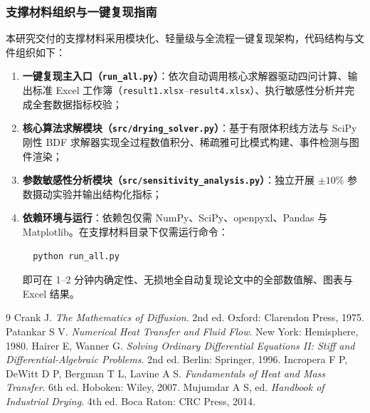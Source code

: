 \documentclass[12pt,a4paper]{ctexart}
\begin{document}
\subsubsection{支撑材料组织与一键复现指南}
本研究交付的支撑材料采用模块化、轻量级与全流程一键复现架构，代码结构与文件组织如下：
\begin{enumerate}[label=(\arabic*)]
  \item \textbf{一键复现主入口（\texttt{run\_all.py}）}：依次自动调用核心求解器驱动四问计算、输出标准 Excel 工作簿（\texttt{result1.xlsx}--\texttt{result4.xlsx}）、执行敏感性分析并完成全套数据指标校验；
  \item \textbf{核心算法求解模块（\texttt{src/drying\_solver.py}）}：基于有限体积线方法与 SciPy 刚性 BDF 求解器实现全过程数值积分、稀疏雅可比模式构建、事件检测与图件渲染；
  \item \textbf{参数敏感性分析模块（\texttt{src/sensitivity\_analysis.py}）}：独立开展 $\pm 10\%$ 参数摄动实验并输出结构化指标；
  \item \textbf{依赖环境与运行}：依赖包仅需 NumPy、SciPy、openpyxl、Pandas 与 Matplotlib。在支撑材料目录下仅需运行命令：
  \begin{verbatim}
  python run_all.py
  \end{verbatim}
  即可在 1--2 分钟内确定性、无损地全自动复现论文中的全部数值解、图表与 Excel 结果。
\end{enumerate}

\begin{thebibliography}{9}
 Crank J. \textit{The Mathematics of Diffusion}. 2nd ed. Oxford: Clarendon Press, 1975.
 Patankar S V. \textit{Numerical Heat Transfer and Fluid Flow}. New York: Hemisphere, 1980.
 Hairer E, Wanner G. \textit{Solving Ordinary Differential Equations II: Stiff and Differential-Algebraic Problems}. 2nd ed. Berlin: Springer, 1996.
 Incropera F P, DeWitt D P, Bergman T L, Lavine A S. \textit{Fundamentals of Heat and Mass Transfer}. 6th ed. Hoboken: Wiley, 2007.
 Mujumdar A S, ed. \textit{Handbook of Industrial Drying}. 4th ed. Boca Raton: CRC Press, 2014.
\end{thebibliography}
\end{document}
